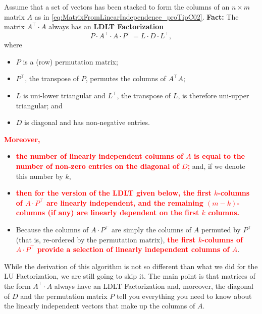 \begin{tcolorbox}[sharp corners, colback=green!30, colframe=green!80!blue,
title=\textbf{ {\Large \textcolor{red}{\bf Uber} Pro-Tip:} \large Number of Linearly Independent Vectors via an Enhanced LU Factorization}]
Assume that a set of vectors has been stacked to form the columns of an $n \times m$ matrix $A$ as in \eqref{eq:MatrixFromLinearIndependence_proTipC02}. \textbf{Fact:} The matrix $A^\top \cdot A$ always has an \textbf{LDLT Factorization}
\begin{equation}
    \label{eq:LDLTfactorization}
    P\cdot A^\top \cdot A \cdot P^\top = L\cdot D \cdot L^\top,
\end{equation}
where
\begin{itemize}
    \item $P$ is a (row) permutation matrix;
    \item $P^\top$, the transpose of $P$, permutes the columns of $A^\top A$;
    \item $L$ is uni-lower triangular and $L^\top$, the transpose of $L$, is therefore uni-upper triangular; and
    \item $D$ is diagonal and has non-negative entries.
\end{itemize}
\textcolor{red}{\bf Moreover,}
\begin{itemize}
    \item \textcolor{red}{\bf the number of linearly independent columns of $A$ is equal to the number of non-zero entries on the diagonal of $D$;} and, if we denote this number by $k$,
    \item  \textcolor{red}{\bf then for the version of the LDLT given below, the first $k$-columns of $A \cdot P^\top$ are linearly independent, and the remaining $(m-k)$-columns (if any) are linearly dependent on the first $k$ columns.} 
    \item Because the columns of $A\cdot P^\top$ are simply the columns of $A$ permuted by $P^\top$ (that is, re-ordered by the permutation matrix), \textcolor{red}{\bf the first $k$-columns of $A \cdot P^\top$ provide a selection of linearly independent columns of $A$}.
\end{itemize}

\end{tcolorbox}

While the derivation of this algorithm is not so different than what we did for the LU Factorization, we are still going to skip it. The main point is that matrices of the form $A^\top \cdot A$ always have an LDLT Factorization and, moreover, the diagonal of $D$ and the permutation matrix $P$ tell you everything you need to know about the linearly independent vectors that make up the columns of $A$. 

